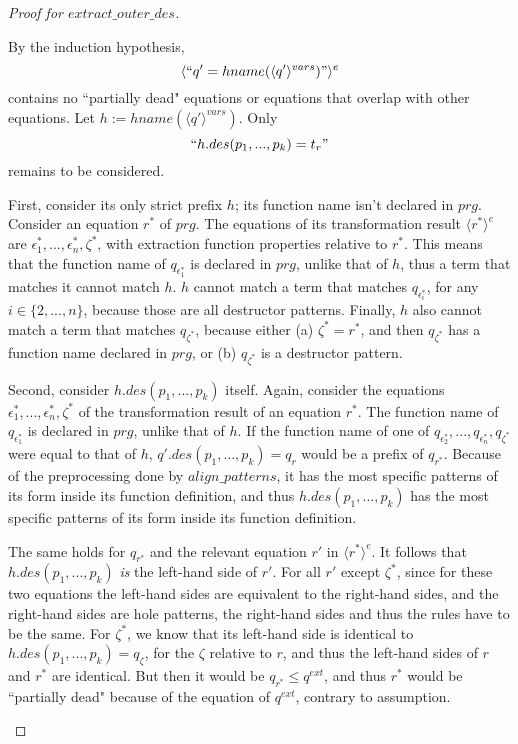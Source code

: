 \documentclass[11pt]{article} %
\begin{document}
\begin{proof}[Proof for $extract\_outer\_des$]
\begin{itemize}
\begin{itemize}
By the induction hypothesis,
\begin{equation*}
\langle `` q' = hname(\langle q' \rangle^{vars}) " \rangle^e
\end{equation*}
contains no ``partially dead" equations or equations that overlap with other equations. Let $h := hname(\langle q' \rangle^{vars})$. Only
\begin{equation*}
`` h.des(p_1, ..., p_k) = t_r "
\end{equation*}
remains to be considered.

First, consider its only strict prefix $h$; its function name isn't declared in $prg$. Consider an equation $r^*$ of $prg$. The equations of its transformation result $\langle r^* \rangle^e$ are $\epsilon^*_1, ..., \epsilon^*_n, \zeta^*$, with extraction function properties relative to $r^*$. This means that the function name of $q_{\epsilon^*_1}$ is declared in $prg$, unlike that of $h$, thus a term that matches it cannot match $h$. $h$ cannot match a term that matches $q_{\epsilon^*_i}$, for any $i \in \{2, ..., n\}$, because those are all destructor patterns. Finally, $h$ also cannot match a term that matches $q_{\zeta^*}$, because either (a) $\zeta^* = r^*$, and then $q_{\zeta^*}$ has a function name declared in $prg$, or (b) $q_{\zeta^*}$ is a destructor pattern.

Second, consider $h.des(p_1, ..., p_k)$ itself. Again, consider the equations $\epsilon^*_1, ..., \epsilon^*_n, \zeta^*$ of the transformation result of an equation $r^*$. The function name of $q_{\epsilon^*_1}$ is declared in $prg$, unlike that of $h$. If the function name of one of $q_{\epsilon^*_2}, ..., q_{\epsilon^*_n}, q_{\zeta^*}$ were equal to that of $h$, $q'.des(p_1, ..., p_k) = q_r$ would be a prefix of $q_{r^*}$. Because of the preprocessing done by $align\_patterns$, it has the most specific patterns of its form inside its function definition, and thus $h.des(p_1, ..., p_k)$ has the most specific patterns of its form inside its function definition.

The same holds for $q_{r^*}$ and the relevant equation $r'$ in $\langle r^* \rangle^e$. It follows that $h.des(p_1, ..., p_k)$ \textit{is} the left-hand side of $r'$. For all $r'$ except $\zeta^*$, since for these two equations the left-hand sides are equivalent to the right-hand sides, and the right-hand sides are hole patterns, the right-hand sides and thus the rules have to be the same. For $\zeta^*$, we know that its left-hand side is identical to $h.des(p_1, ..., p_k) = q_\zeta$, for the $\zeta$ relative to $r$, and thus the left-hand sides of $r$ and $r^*$ are identical. But then it would be $q_{r^*} \leq q^{ext}$, and thus $r^*$ would be ``partially dead" because of the equation of $q^{ext}$, contrary to assumption.


\end{itemize}
\end{itemize}
\end{proof}
\end{document}
